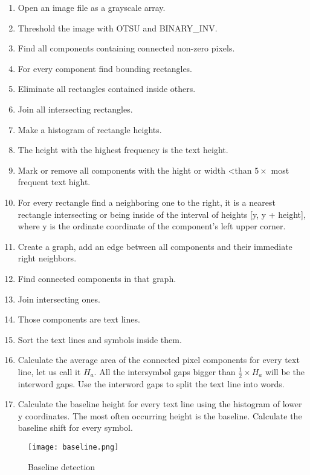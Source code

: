 \documentclass{article}
\begin{document}
\begin{multicols}{2}
\begin{enumerate}
\item Open an image file as a grayscale array.
\item Threshold the image with OTSU and BINARY\_INV.
\item Find all components containing connected non-zero pixels.
\item For every component find bounding rectangles.
\item Eliminate all rectangles contained inside others.
\item Join all intersecting rectangles.
\item Make a histogram of rectangle heights.
\item The height with the highest frequency is the text height.
\item Mark or remove all components with the hight or width \textless than $ 5 \times $ most frequent text hight.
\item For every rectangle find a neighboring one to the right, it is a nearest rectangle  intersecting or being inside of the interval of heights [y, y + height], where y is the ordinate coordinate of the component's left upper corner.
\item Create a graph, add an edge between all components and their immediate right neighbors.
\item Find connected components in that graph.
\item Join intersecting ones.
\item Those components are text lines.
\item Sort the text lines and symbols inside them.
\item Calculate the average area of the connected pixel components for every text line, let us call it $H_a$. All the intersymbol gaps bigger than $\frac{1}{2} \times H_a$ will be the interword gaps. Use the interword gaps to split the text line into words.
\item Calculate the baseline height for every text line using the histogram of lower y coordinates. The most often occurring height is the baseline. Calculate the baseline shift for every symbol.

\end{enumerate}


\end{multicols}
	

\begin{figure}
\texttt{[image: baseline.png]}
\label{fig:baseline}
\caption{Baseline detection}
\end{figure}

	
\end{document}
